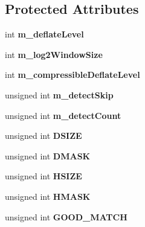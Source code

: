 \subsection*{Protected Attributes}
\begin{DoxyCompactItemize}
\item 
\hypertarget{class_deflator_a028cf53ff50d3bdd7ce3b8823fb01036}{
int {\bfseries m\_\-deflateLevel}}
\label{class_deflator_a028cf53ff50d3bdd7ce3b8823fb01036}

\item 
\hypertarget{class_deflator_a844bd3068fb0eab4d8248a09dea9cbec}{
int {\bfseries m\_\-log2WindowSize}}
\label{class_deflator_a844bd3068fb0eab4d8248a09dea9cbec}

\item 
\hypertarget{class_deflator_ae1a3ffe221fd4460b6d8f477fb386029}{
int {\bfseries m\_\-compressibleDeflateLevel}}
\label{class_deflator_ae1a3ffe221fd4460b6d8f477fb386029}

\item 
\hypertarget{class_deflator_ac03ff39f709115c8e8919da96ef7ac6f}{
unsigned int {\bfseries m\_\-detectSkip}}
\label{class_deflator_ac03ff39f709115c8e8919da96ef7ac6f}

\item 
\hypertarget{class_deflator_adacfebd48fd53d01b9961b3e05e27b0e}{
unsigned int {\bfseries m\_\-detectCount}}
\label{class_deflator_adacfebd48fd53d01b9961b3e05e27b0e}

\item 
\hypertarget{class_deflator_acbb3318729a2a96a2d957c36c7dcd158}{
unsigned int {\bfseries DSIZE}}
\label{class_deflator_acbb3318729a2a96a2d957c36c7dcd158}

\item 
\hypertarget{class_deflator_abc8dd3d3c28d9b188dd1c19510294a0b}{
unsigned int {\bfseries DMASK}}
\label{class_deflator_abc8dd3d3c28d9b188dd1c19510294a0b}

\item 
\hypertarget{class_deflator_ac94920fbb6c4b08bafa4ec541b9f0239}{
unsigned int {\bfseries HSIZE}}
\label{class_deflator_ac94920fbb6c4b08bafa4ec541b9f0239}

\item 
\hypertarget{class_deflator_adc06bdafc7a354d1665bf141e3ddc9cc}{
unsigned int {\bfseries HMASK}}
\label{class_deflator_adc06bdafc7a354d1665bf141e3ddc9cc}

\item 
\hypertarget{class_deflator_ad5abb84cfaeaa82079f4c98930ba69ce}{
unsigned int {\bfseries GOOD\_\-MATCH}}
\label{class_deflator_ad5abb84cfaeaa82079f4c98930ba69ce}


\end{DoxyCompactItemize}
